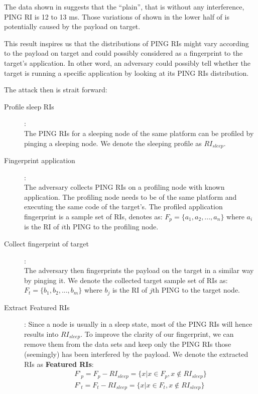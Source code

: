 The data shown in  suggests that the “plain”, that is without any interference, PING RI is 12 to 13 ms. Those variations of  shown in the lower half of  is potentially caused by the payload on target.

This result inspires us that the distributions of PING RIs might vary according to the payload on target and could possibly considered as a fingerprint to the target’s application. In other word, an adversary could possibly tell whether the target is running a specific application by looking at its PING RIs distribution.

The attack then is strait forward:
\begin{description}
\item[Profile sleep RIs]: \hfill\\
The PING RIs for a sleeping node of the same platform can be profiled by pinging a sleeping node. We denote the sleeping profile as $RI_{sleep}$. 

\item[Fingerprint application]: \hfill\\
The adversary collects PING RIs on a profiling node with known application. The profiling node needs to be of the same platform and executing the same code of the target’s. The profiled application fingerprint is a sample set of RIs, denotes as: $F_p=\{a_1, a_2, ... , a_n\}$ where $a_i$ is the RI of $i$th PING to the profiling node. 

\item[Collect fingerprint of target]: \hfill\\
The adversary then fingerprints the payload on the target in a similar way by pinging it. We denote the collected target sample set of RIs as: $F_t=\{b_1, b_2, ..., b_m\}$ where $b_j$ is the RI of $j$th PING to the target node.

\item[Extract Featured RIs]: Since a node is usually in a sleep state, most of the PING RIs will hence results into $RI_{sleep}$. To improve the clarity of our fingerprint, we can remove them from the data sets and keep only the PING RIs those (seemingly) has been interfered by the payload. We denote the extracted RIs as \textbf{Featured RIs}:
\begin{eqnarray*}
F’_p = F_p - RI_{sleep} = \{x | x \in F_p,  x \notin RI_{sleep}\}\\
F’_t = F_t - RI_{sleep} = \{x | x \in F_t,  x \notin RI_{sleep}\}
\end{eqnarray*}


\end{description}
